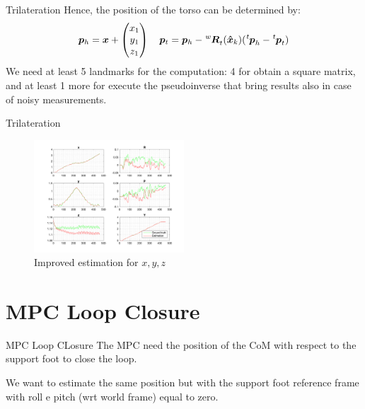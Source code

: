 \documentclass[10pt]{beamer}
\begin{document}
    \begin{frame}[fragile]{Trilateration}
        Hence, the position of the torso can be determined by:
          \begin{equation*}
            \bm{p}_h
                =
            \bm{x} +
            \begin{pmatrix}
                x_1 \\
                y_1 \\
                z_1
            \end{pmatrix} \quad
            \bm{p}_t = \bm{p}_h - \tensor[^w]{\bm{R}}{_t}(\bm{\hat{x}}_{k}) (\tensor[^t]{\bm{p}}{_h} - \tensor[^t]{\bm{p}}{_t})
        \end{equation*}
        We need at least 5 landmarks for the computation: 4 for obtain a
        square matrix, and at least 1 more for execute the pseudoinverse that
        bring results also in case of noisy measurements.
    \end{frame}

    \begin{frame}[fragile]{Trilateration}
        \begin{figure}
        \caption{Improved estimation for $x, y, z$}
        \centering
        \includegraphics[width=0.5\textwidth]{images/trilateration.png}
        \end{figure}
    \end{frame}

    \section{MPC Loop Closure}

    \begin{frame}{MPC Loop CLosure}
    	The MPC need the position of the CoM with respect to the support
        foot to close the loop.

    	We want to estimate the same position but with the support foot
        reference frame with roll e pitch (wrt world frame) equal to zero.
    \end{frame}
\end{document}
